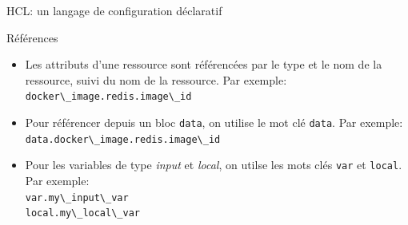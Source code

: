 \documentclass[aspectratio=169,10pt]{beamer}
\begin{document}

\begin{frame}{HCL: un langage de configuration déclaratif}

 \begin{alertblock}{Références}
    \begin{itemize}
        \item Les attributs d'une ressource sont référencées par le \alert{type} et le \alert{nom} de la ressource, suivi du nom de la ressource. Par exemple: \lstinline[language=HCL]!docker\_image.redis.image\_id!
        \item Pour référencer depuis un bloc \lstinline[language=HCL]!data!, on utilise le mot clé \lstinline[language=HCL]!data!. Par exemple: \lstinline[language=HCL]!data.docker\_image.redis.image\_id!
        \item Pour les variables de type \emph{input} et \emph{local}, on utilse les mots clés \lstinline[language=HCL]!var! et \lstinline[language=HCL]!local!. Par exemple: \\
        \lstinline[language=HCL]!var.my\_input\_var! \\ \lstinline[language=HCL]!local.my\_local\_var!
    \end{itemize}       

    \end{alertblock}

\end{frame}

\end{document}
